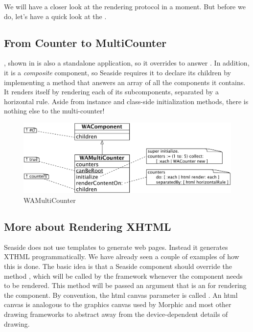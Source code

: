 \documentclass[a4paper,10pt,twoside]{book}
\begin{document}
We will have a closer look at the rendering protocol in a moment.
But before we do, let's have a quick look at the .

\subsection{From Counter to MultiCounter}

, shown in  is also a standalone application, so it overrides  to answer .
In addition, it is a \emph{composite} component, so Seaside requires it to declare its children by implementing a method  that answers an array of all the components it contains.
It renders itself by rendering each of its subcomponents, separated by a horizontal rule.
Aside from instance and class-side initialization methods, there is nothing else to the multi-counter!

\begin{figure}[bht]
\begin{center}
\includegraphics[width=\textwidth]{WAMultiCounter}
\caption{WAMultiCounter 
}
\label{fig:WAMultiCounter}
\end{center}
\end{figure}

\subsection{More about Rendering XHTML}

Seaside does not use templates to generate web pages.
Instead it generates XTHML programmatically.
We have already seen a couple of examples of how this is done.
The basic idea is that a Seaside component should override the method , which will be called by the framework whenever the component needs to be rendered.
This method will be passed an argument that is an   for rendering the component.  By convention, the html canvas parameter is called .
An html canvas is analogous to the graphics canvas used by Morphic and most other drawing frameworks to abstract away from the device-dependent details of drawing.
 
\end{document}
